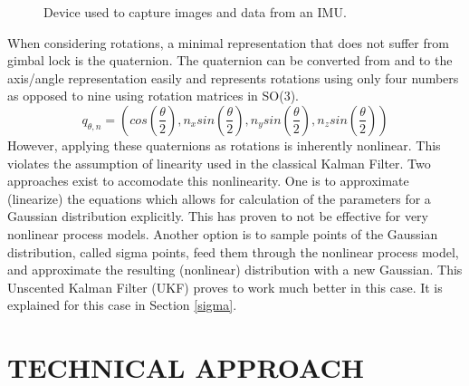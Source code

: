 \documentclass[letterpaper, 10 pt, conference]{ieeeconf}  %
\begin{document}
   \begin{figure}[thpb]
      \centering
      \caption{Device used to capture images and data from an IMU.}
      \label{device}
   \end{figure}

When considering rotations, a minimal representation that does not suffer from gimbal lock is the quaternion. The quaternion can be converted from and to the axis/angle representation easily and represents rotations using only four numbers as opposed to nine using rotation matrices in SO(3).
$$q_{\theta, n} = \left(cos\left(\frac{\theta}{2}\right), n_x sin\left(\frac{\theta}{2}\right), n_y sin\left(\frac{\theta}{2}\right), n_z sin\left(\frac{\theta}{2}\right)\right)$$
However, applying these quaternions as rotations is inherently nonlinear. This violates the assumption of linearity used in the classical Kalman Filter. Two approaches exist to accomodate this nonlinearity. One is to approximate (linearize) the equations which allows for calculation of the parameters for a Gaussian distribution explicitly. This has proven to not be effective for very nonlinear process models. Another option is to sample points of the Gaussian distribution, called sigma points, feed them through the nonlinear process model, and approximate the resulting (nonlinear) distribution with a new Gaussian. This  Unscented Kalman Filter (UKF) proves to work much better in this case. It is explained for this case in Section \ref{sigma}.


\section{TECHNICAL APPROACH}
\end{document}
